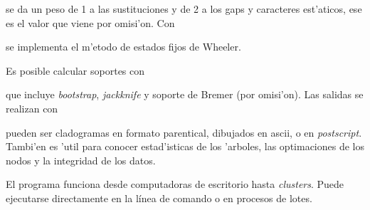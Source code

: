
se da un peso de 1 a las sustituciones y de 2 a los gaps y caracteres est'aticos, ese es el valor que viene por omisi'on. Con 


se implementa el m'etodo de estados fijos de Wheeler.


Es posible calcular soportes con 


que incluye \textit{bootstrap}, \textit{jackknife} y soporte de Bremer (por omisi'on). Las salidas se realizan con 


 pueden ser cladogramas en formato parentical, dibujados en ascii, o en \textit{postscript}. Tambi'en es 'util para conocer estad'isticas de los 'arboles, las optimaciones de los nodos y la integridad de los datos.
 
 
El programa funciona desde computadoras de escritorio hasta \textit{clusters}. Puede ejecutarse directamente en la l\'inea de comando o en procesos de lotes.
